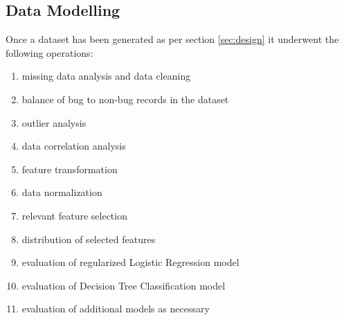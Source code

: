 \subsection{Data Modelling}

Once a dataset has been generated as per section \ref{sec:design} it underwent the following operations:
\begin{enumerate}\label{lst:dataset-ops}
    \item missing data analysis and data cleaning \label{lst:dataset-ops.item:data-cleaning}
    \item balance of bug to non-bug records in the dataset \label{lst:dataset-ops.item:bug-to-non-bug-balance}
    \item outlier analysis \label{lst:dataset-ops.item:outliers}
    \item data correlation analysis \label{lst:dataset-ops.item:data-correlation}
    \item feature transformation \label{lst:dataset-ops.item:feature-transformation}
    \item data normalization \label{lst:dataset-ops.item:data-scaling}
    \item relevant feature selection \label{lst:dataset-ops.item:feature-selection}
    \item distribution of selected features \label{lst:dataset-ops.item:attribute-distribution}
    \item evaluation of regularized Logistic Regression model \label{lst:dataset-ops.item:ml-logistic-regression}
    \item evaluation of Decision Tree Classification model \label{lst:dataset-ops.item:ml-decision-tree}
    \item evaluation of additional models as necessary \label{lst:dataset-ops.item:ml-models-additional}
\end{enumerate}

